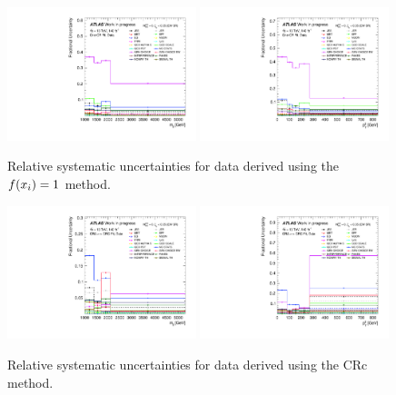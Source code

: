 \begin{figure}[t]
  \centering
  \includegraphics[width=0.49\textwidth]{plots/diffx/final/data/1cr/Systematic_Uncertainties_data_mjj_1cr_QCD_Sh2211_0p01sigma.pdf}
  \includegraphics[width=0.49\textwidth]{plots/diffx/final/data/1cr/Systematic_Uncertainties_data_jj_pt_1cr_QCD_Sh2211_0p01sigma.pdf}
  \caption{Relative systematic uncertainties for data derived using the $f(x_i)=1$ method.\label{fig:vbswy:relunc_1cr}}
\end{figure}

\begin{figure}[t]
  \centering
  \includegraphics[width=0.49\textwidth]{plots/diffx/final/data/cra/Systematic_Uncertainties_data_mjj_ngapjets_QCD_Sh2211_0p01sigma.pdf}
  \includegraphics[width=0.49\textwidth]{plots/diffx/final/data/cra/Systematic_Uncertainties_data_jj_pt_ngapjets_QCD_Sh2211_0p01sigma.pdf}
  \caption{Relative systematic uncertainties for data derived using the CRc method.\label{fig:vbswy:relunc_cra}}
\end{figure}

